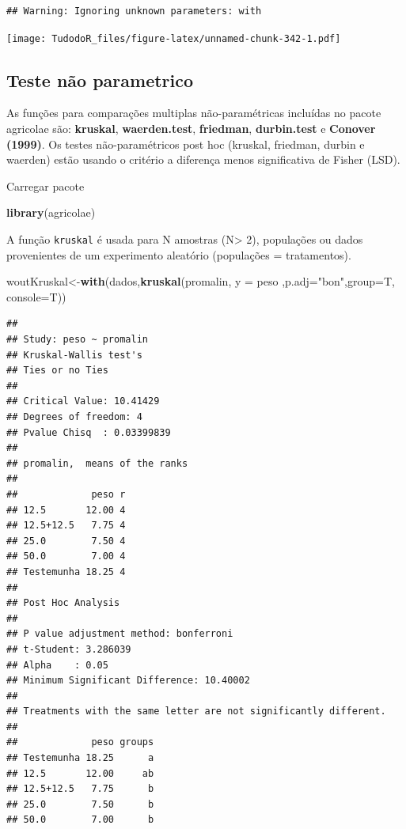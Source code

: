 \documentclass[
]{book}
\newenvironment{Shaded}{\begin{snugshade}}{\end{snugshade}}
\newcommand{\DataTypeTok}[1]{\textcolor[rgb]{0.13,0.29,0.53}{#1}}
\newcommand{\KeywordTok}[1]{\textcolor[rgb]{0.13,0.29,0.53}{\textbf{#1}}}
\newcommand{\NormalTok}[1]{#1}
\newcommand{\StringTok}[1]{\textcolor[rgb]{0.31,0.60,0.02}{#1}}
\begin{document}
\begin{verbatim}
## Warning: Ignoring unknown parameters: with
\end{verbatim}

\texttt{[image: TudodoR\_files/figure-latex/unnamed-chunk-342-1.pdf]}

\hypertarget{teste-nuxe3o-parametrico}{%
\subsection{Teste não parametrico}\label{teste-nuxe3o-parametrico}}

As funções para comparações multiplas não-paramétricas incluídas no pacote agricolae são: \textbf{kruskal}, \textbf{waerden.test}, \textbf{friedman}, \textbf{durbin.test} e \textbf{Conover (1999)}.
Os testes não-paramétricos post hoc (kruskal, friedman, durbin e waerden) estão usando o critério a diferença menos significativa de Fisher (LSD).

Carregar pacote

\begin{Shaded}
\begin{Highlighting}[]
\KeywordTok{library}\NormalTok{(agricolae)}
\end{Highlighting}
\end{Shaded}

A função \texttt{kruskal} é usada para N amostras (N\textgreater{} 2), populações ou dados provenientes de um experimento aleatório (populações = tratamentos).

\begin{Shaded}
\begin{Highlighting}[]
\NormalTok{woutKruskal<-}\KeywordTok{with}\NormalTok{(dados,}\KeywordTok{kruskal}\NormalTok{(promalin, }\DataTypeTok{y =}\NormalTok{ peso}
\NormalTok{  ,}\DataTypeTok{p.adj=}\StringTok{"bon"}\NormalTok{,}\DataTypeTok{group=}\NormalTok{T, }\DataTypeTok{console=}\NormalTok{T))}
\end{Highlighting}
\end{Shaded}

\begin{verbatim}
## 
## Study: peso ~ promalin
## Kruskal-Wallis test's
## Ties or no Ties
## 
## Critical Value: 10.41429
## Degrees of freedom: 4
## Pvalue Chisq  : 0.03399839 
## 
## promalin,  means of the ranks
## 
##             peso r
## 12.5       12.00 4
## 12.5+12.5   7.75 4
## 25.0        7.50 4
## 50.0        7.00 4
## Testemunha 18.25 4
## 
## Post Hoc Analysis
## 
## P value adjustment method: bonferroni
## t-Student: 3.286039
## Alpha    : 0.05
## Minimum Significant Difference: 10.40002 
## 
## Treatments with the same letter are not significantly different.
## 
##             peso groups
## Testemunha 18.25      a
## 12.5       12.00     ab
## 12.5+12.5   7.75      b
## 25.0        7.50      b
## 50.0        7.00      b
\end{verbatim}
\end{document}
